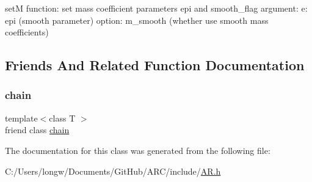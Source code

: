 setM function\+: set mass coefficient parameters epi and smooth\+\_\+flag argument\+: e\+: epi (smooth parameter) option\+: m\+\_\+smooth (whether use smooth mass coefficients) 



\subsection{Friends And Related Function Documentation}
\hypertarget{classchainpars_a498fbb4337b9878a5f0044996e4a2489}{}\label{classchainpars_a498fbb4337b9878a5f0044996e4a2489} 
\subsubsection{\texorpdfstring{chain}{chain}}
{\footnotesize\ttfamily template$<$class T $>$ \\
friend class \hyperlink{classchain}{chain}\hspace{0.3cm}{\ttfamily [friend]}}



The documentation for this class was generated from the following file\+:\begin{DoxyCompactItemize}
\item 
C\+:/\+Users/longw/\+Documents/\+Git\+Hub/\+A\+R\+C/include/\hyperlink{AR_8h}{A\+R.\+h}\end{DoxyCompactItemize}
